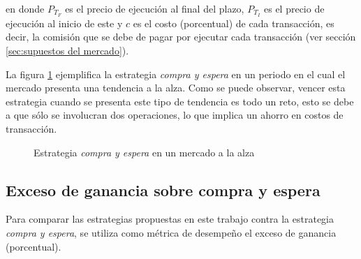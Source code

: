 \documentclass[12pt]{report}
\theoremstyle{break}
\theoremstyle{break}
\begin{document}
en donde $P_{T_F}$ es el precio de ejecución al final del plazo, $P_{T_I}$ es el precio de ejecución al inicio de este y $c$ es el costo (porcentual) de cada transacción, es decir, la comisión que se debe de pagar por ejecutar cada transacción (ver sección \ref{sec:supuestos del mercado}). 

La figura \ref{imagen:buy hold alza} ejemplifica la estrategia \textit{compra y espera} en un periodo en el cual el mercado presenta una tendencia a la alza. Como se puede observar, vencer esta estrategia cuando se presenta este tipo de tendencia es todo un reto, esto se debe a que sólo se involucran dos operaciones, lo que implica un ahorro en costos de transacción.

\begin{figure}[ht]
\centering
{}
\caption{\label{imagen:buy hold alza} Estrategia \textit{compra y espera} en un mercado a la alza}
\end{figure}

\subsection{Exceso de ganancia sobre compra y espera}
\label{subseccion:exceso de ganancia}

Para comparar las estrategias propuestas en este trabajo contra la estrategia \textit{compra y espera}, se utiliza como métrica de desempeño el exceso de ganancia (porcentual).
\end{document}
